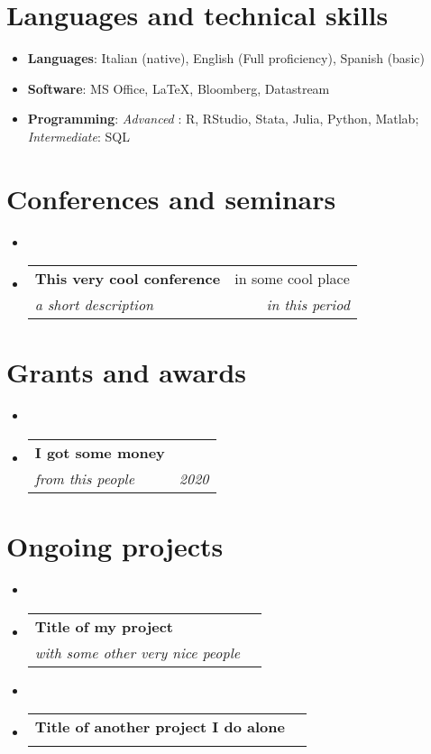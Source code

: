 \documentclass[letterpaper,11pt]{article}
\makeatletter
\newcommand{\sh}[4]{
  \vspace{-2pt}\item
    \begin{tabular*}{0.97\textwidth}[t]{l@{\extracolsep{\fill}}r}
      \textbf{#1} & #2 \\
      \textit{\small#3} & \textit{\small #4} \\
    \end{tabular*}\vspace{-7pt}
}
\makeatother
\begin{document}
\hypertarget{languages-and-technical-skills}{%
\section{Languages and technical
skills}\label{languages-and-technical-skills}}

\begin{itemize}
\item
  \textbf{Languages}: Italian (native), English (Full proficiency),
  Spanish (basic)
\item
  \textbf{Software}: MS Office, \LaTeX, Bloomberg, Datastream
\item
  \textbf{Programming}: \emph{Advanced} : R, RStudio, Stata, Julia,
  Python, Matlab; \emph{Intermediate}: SQL
\end{itemize}

\hypertarget{conferences-and-seminars}{%
\section{Conferences and seminars}\label{conferences-and-seminars}}

\begin{itemize}
\item
 \sh{This very cool conference}{in some cool place}{a short description}{in this period}\empty \end{itemize}

\hypertarget{grants-and-awards}{%
\section{Grants and awards}\label{grants-and-awards}}

\begin{itemize}
\item
 \sh{I got some money}{\empty}{from this people}{2020} \end{itemize}

\hypertarget{ongoing-projects}{%
\section{Ongoing projects}\label{ongoing-projects}}

\begin{itemize}
\item
 \sh{Title of my project}{\empty}{with some other very nice people}{\empty}
\item
\sh{Title of another project I do alone}{\empty}{\empty}{\empty} \end{itemize}
\end{document}
